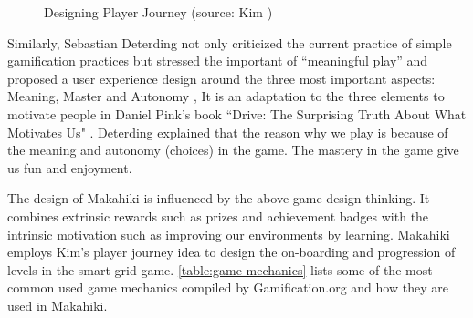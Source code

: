 \begin{figure}[ht!]
	\centering
		\caption{Designing Player Journey (source: Kim \cite {Kim2010})}
		\label{fig:design-player-journey}
\end{figure}

Similarly, Sebastian Deterding not only criticized the current practice of simple gamification practices but stressed the important of ``meaningful play'' and proposed a user experience design around the three most important aspects: Meaning, Master and Autonomy \cite {Deterding2011meaningful}, It is an adaptation to the three elements to motivate people in Daniel Pink's book ``Drive: The Surprising Truth About What Motivates Us" \cite {pink2009drive}. Deterding explained that the reason why we play is because of the meaning and autonomy (choices) in the game. The mastery in the game give us fun and enjoyment.

The design of Makahiki is influenced by the above game design thinking. It combines extrinsic rewards such as prizes and achievement badges with the intrinsic motivation such as improving our environments by learning. Makahiki employs Kim's player journey idea \cite{Kim2010} to design the on-boarding and progression of levels in the smart grid game. \autoref{table:game-mechanics} lists some of the most common used game mechanics compiled by Gamification.org\cite{gamificationwiki} and how they are used in Makahiki.

